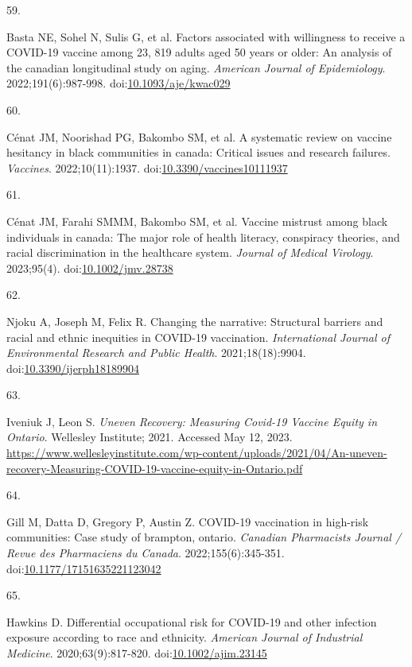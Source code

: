 \documentclass[
]{article}
\newlength{\cslhangindent}
\newlength{\csllabelwidth}
\newlength{\cslentryspacingunit} %
\newenvironment{CSLReferences}[2] %
 {%
  \setlength{\parindent}{0pt}
  \ifodd #1
  \let\oldpar\par
  \def\par{\hangindent=\cslhangindent\oldpar}
  \fi
  \setlength{\parskip}{#2\cslentryspacingunit}
 }%
 {}
\newcommand{\CSLLeftMargin}[1]{\parbox[t]{\csllabelwidth}{#1}}
\newcommand{\CSLRightInline}[1]{\parbox[t]{\linewidth - \csllabelwidth}{#1}\break}
\begin{document}
\begin{CSLReferences}{0}{0}
\leavevmode{}%
\CSLLeftMargin{59. }%
\CSLRightInline{Basta NE, Sohel N, Sulis G, et al. Factors associated
with willingness to receive a {COVID}-19 vaccine among 23, 819 adults
aged 50 years or older: An analysis of the canadian longitudinal study
on aging. \emph{American Journal of Epidemiology}. 2022;191(6):987-998.
doi:\href{https://doi.org/10.1093/aje/kwac029}{10.1093/aje/kwac029}}

\leavevmode{}%
\CSLLeftMargin{60. }%
\CSLRightInline{Cénat JM, Noorishad PG, Bakombo SM, et al. A systematic
review on vaccine hesitancy in black communities in canada: Critical
issues and research failures. \emph{Vaccines}. 2022;10(11):1937.
doi:\href{https://doi.org/10.3390/vaccines10111937}{10.3390/vaccines10111937}}

\leavevmode{}%
\CSLLeftMargin{61. }%
\CSLRightInline{Cénat JM, Farahi SMMM, Bakombo SM, et al. Vaccine
mistrust among black individuals in canada: The major role of health
literacy, conspiracy theories, and racial discrimination in the
healthcare system. \emph{Journal of Medical Virology}. 2023;95(4).
doi:\href{https://doi.org/10.1002/jmv.28738}{10.1002/jmv.28738}}

\leavevmode{}%
\CSLLeftMargin{62. }%
\CSLRightInline{Njoku A, Joseph M, Felix R. Changing the narrative:
Structural barriers and racial and ethnic inequities in {COVID}-19
vaccination. \emph{International Journal of Environmental Research and
Public Health}. 2021;18(18):9904.
doi:\href{https://doi.org/10.3390/ijerph18189904}{10.3390/ijerph18189904}}

\leavevmode{}%
\CSLLeftMargin{63. }%
\CSLRightInline{Iveniuk J, Leon S. \emph{Uneven Recovery: Measuring
Covid-19 Vaccine Equity in Ontario}. Wellesley Institute; 2021. Accessed
May 12, 2023.
\url{https://www.wellesleyinstitute.com/wp-content/uploads/2021/04/An-uneven-recovery-Measuring-COVID-19-vaccine-equity-in-Ontario.pdf}}

\leavevmode{}%
\CSLLeftMargin{64. }%
\CSLRightInline{Gill M, Datta D, Gregory P, Austin Z. {COVID}-19
vaccination in high-risk communities: Case study of brampton, ontario.
\emph{Canadian Pharmacists Journal / Revue des Pharmaciens du Canada}.
2022;155(6):345-351.
doi:\href{https://doi.org/10.1177/17151635221123042}{10.1177/17151635221123042}}

\leavevmode{}%
\CSLLeftMargin{65. }%
\CSLRightInline{Hawkins D. Differential occupational risk for {COVID}-19
and other infection exposure according to race and ethnicity.
\emph{American Journal of Industrial Medicine}. 2020;63(9):817-820.
doi:\href{https://doi.org/10.1002/ajim.23145}{10.1002/ajim.23145}}


\end{CSLReferences}
\end{document}
